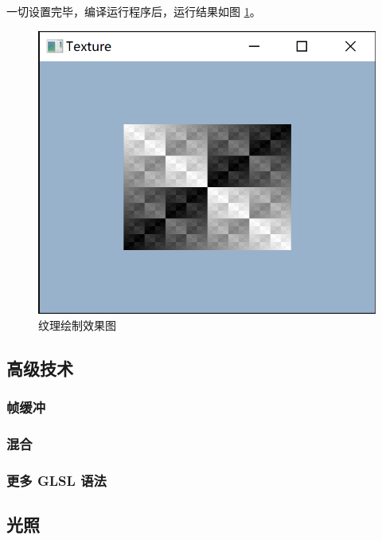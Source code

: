 \documentclass[fontset=windows]{ctexart}
\begin{document}
一切设置完毕，编译运行程序后，运行结果如图 \ref{fig-gl:texture-rendered}。

\begin{figure}[htbp]
\centering
\includegraphics[width=0.5\linewidth]{imgs/sec 5.2/texture.png}
\caption{纹理绘制效果图}
\label{fig-gl:texture-rendered}
\end{figure}

\subsection{高级技术}

\subsubsection{帧缓冲}

\subsubsection{混合}

\subsubsection{更多 GLSL 语法}

\subsection{光照}
\end{document}
